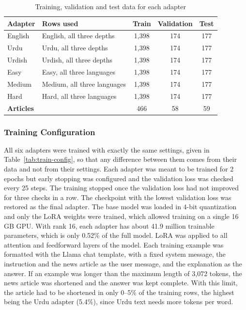 \documentclass{FastFyp}
\begin{document}
\begin{table}[H]
\centering
\caption{Training, validation and test data for each adapter}
\label{tab:adapter-data}
\small
\begin{tabular}{|l|l|c|c|c|}
\hline
\textbf{Adapter} & \textbf{Rows used} & \textbf{Train} & \textbf{Validation} & \textbf{Test} \\ \hline
English  & English, all three depths & 1,398 & 174 & 177 \\ \hline
Urdu     & Urdu, all three depths    & 1,398 & 174 & 177 \\ \hline
Urdish   & Urdish, all three depths  & 1,398 & 174 & 177 \\ \hline
Easy     & Easy, all three languages   & 1,398 & 174 & 177 \\ \hline
Medium   & Medium, all three languages & 1,398 & 174 & 177 \\ \hline
Hard     & Hard, all three languages   & 1,398 & 174 & 177 \\ \hline
\textbf{Articles} & & 466 & 58 & 59 \\ \hline
\end{tabular}
\end{table}

\subsubsection{Training Configuration}
All six adapters were trained with exactly the same settings, given in Table~\ref{tab:train-config}, so that any difference between them comes from their data and not from their settings. Each adapter was meant to be trained for 2 epochs but early stopping was configured and the validation loss was checked every 25 steps. The training stopped once the validation loss had not improved for three checks in a row. The checkpoint with the lowest validation loss was restored as the final adapter. The base model was loaded in 4-bit quantization and only the LoRA weights were trained, which allowed training on a single 16\,GB GPU. With rank 16, each adapter has about 41.9 million trainable parameters, which is only 0.52\% of the full model. LoRA was applied to all attention and feedforward layers of the model. Each training example was formatted with the Llama chat template, with a fixed system message, the instruction and the news article as the user message, and the explanation as the answer. If an example was longer than the maximum length of 3,072 tokens, the news article was shortened and the answer was kept complete. With this limit, the article had to be shortened in only 0--5\% of the training rows, the highest being the Urdu adapter (5.4\%), since Urdu text needs more tokens per word.
\end{document}
